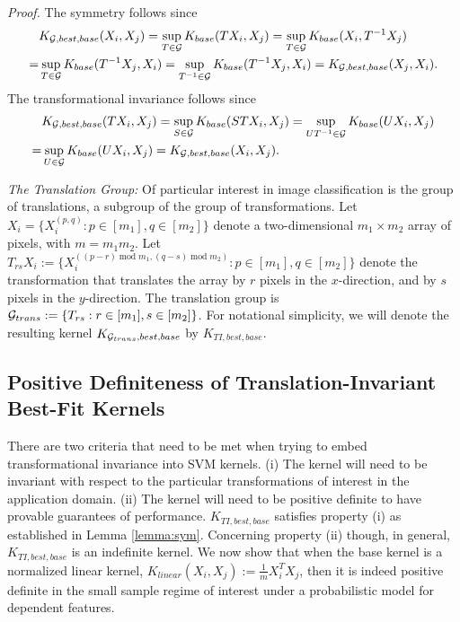 \documentclass{article}
\theoremstyle{plain}
\theoremstyle{definition}
\theoremstyle{remark}
\begin{document}
\textit{Proof.} 
The symmetry follows since
    \begin{align*}
        &K_{{\cal{G}},best,base} (X_i, X_j) = \sup_{T \in {\cal{G}}} K_{base}(T X_i, X_j) = \sup_{T \in {\cal{G}}} K_{base}(X_i, T^{-1} X_j) \\
        =& \sup_{T \in {\cal{G}}} K_{base}(T^{-1} X_j, X_i) = \sup_{T^{-1} \in {\cal{G}}} K_{base}(T^{-1} X_j, X_i) = K_{{\cal{G}},best,base} (X_j, X_i).
    \end{align*}
    The transformational invariance follows since
        \begin{align*}
        &K_{{\cal{G}},best,base} (TX_i, X_j) = \sup_{S \in {\cal{G}}} K_{base}(ST X_i, X_j) = \sup_{UT^{-1} \in {\cal{G}}} K_{base}(U X_i, X_j) \\
        =& \sup_{U \in {\cal{G}}} K_{base}(U X_i, X_j) = K_{{\cal{G}},best,base} (X_i, X_j). 
        \end{align*}

\noindent \textit{The Translation Group:}
Of particular interest in image classification is the group of translations, a subgroup of the group of transformations. Let $X_i = \{ X_i^{(p,q)}: p \in [m_1], q \in [m_2]\}$ denote a two-dimensional $m_1 \times m_2$ array of pixels, with $m = m_1m_2$. Let $T_{rs} X_i := \{ X_i^{((p-r) \operatorname{mod} m_1, (q-s) \operatorname{mod} m_2)}: p \in [m_1], q \in [m_2]\}$ denote the transformation that translates the array by $r$ pixels in the $x$-direction, and by $s$ pixels in the $y$-direction. The translation group is ${\cal{G}}_{trans} :=\{T_{rs}: r \in [m_1], s \in [m_2] \}$. For notational simplicity, we will denote the resulting kernel $K_{{\cal{G}}_{trans},best,base}$ by $K_{TI,best,base}$. 


\subsection{Positive Definiteness of Translation-Invariant Best-Fit Kernels}
\label{subsec:pd}
There are two criteria that need to be met when trying to embed transformational invariance into SVM kernels. (i) The kernel will need to be invariant with respect to the particular transformations of interest in the application domain. (ii) The kernel will need to be positive definite to have provable guarantees of performance. 
$K_{TI,best,base}$ satisfies property (i) as established in Lemma \ref{lemma:sym}. Concerning property (ii) though, in general, $K_{TI,best,base}$ is an indefinite kernel. We now show that when the base kernel is a normalized linear kernel, $K_{linear}(X_i, X_j) := \frac{1}{m} X_i^T X_j$, then it is indeed positive definite in the small sample regime of interest under a probabilistic model for dependent features.
\end{document}
